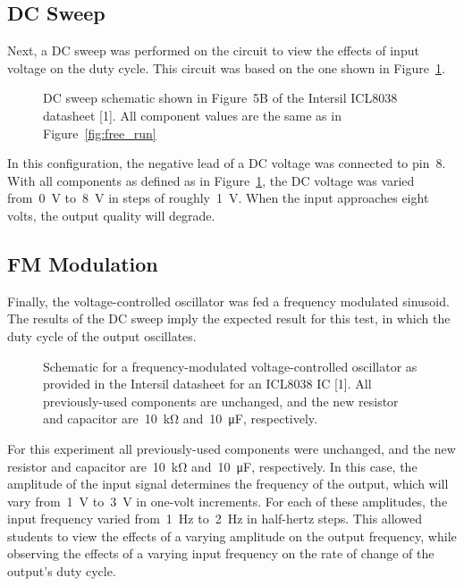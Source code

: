 \subsection{DC Sweep}
Next, a DC sweep was performed on the circuit to view the effects of input
voltage on the duty cycle.  This circuit was based on the one shown in
Figure~\ref{fig:dc_sweep}.
%
\begin{figure}[H]
	\centering
	
	\parbox{.6\textwidth}{
	\caption[DC Sweep Schematic]{DC sweep schematic shown in Figure~5B of the Intersil ICL8038
	datasheet [1].  All component values are the same as in
	Figure~\ref{fig:free_run}}
	\label{fig:dc_sweep}}
\end{figure}
%
In this configuration, the negative lead of a DC voltage was connected to pin~8.
With all components as defined as in Figure~\ref{fig:dc_sweep}, the DC voltage
was varied from~\SI{0}{\volt} to~\SI{8}{\volt} in steps of
roughly~\SI{1}{\volt}.  When the input approaches eight volts, the output
quality will degrade.

\subsection{FM Modulation}
Finally, the voltage-controlled oscillator was fed a frequency modulated
sinusoid.  The results of the DC sweep imply the expected result for
this test, in which the duty cycle of the output oscillates.
%
\begin{figure}[H]
	\centering
	
	\parbox{.6\textwidth}{
	\caption[Frequency Modulation Schematic]{Schematic for a frequency-modulated voltage-controlled oscillator
	as provided in the Intersil datasheet for an ICL8038 IC [1].  All
	previously-used components are unchanged, and the new resistor and
	capacitor are~\SI{10}{\kilo\ohm} and~\SI{10}{\micro\farad}, respectively.}
	\label{fig:freq_mod}}
\end{figure}
%
For this experiment all previously-used components were unchanged, and the new
resistor and capacitor are~\SI{10}{\kilo\ohm} and~\SI{10}{\micro\farad},
respectively.  In this case, the amplitude of the input signal determines the
frequency of the output, which will vary from~\SI{1}{\volt} to~\SI{3}{\volt} in
one-volt increments.  For each of these amplitudes, the input frequency
varied from~\SI{1}{\hertz} to~\SI{2}{\hertz} in half-hertz steps.  This allowed
students to view the effects of a varying amplitude on the output frequency,
while observing the effects of a varying input frequency on the rate of change
of the output's duty cycle.
